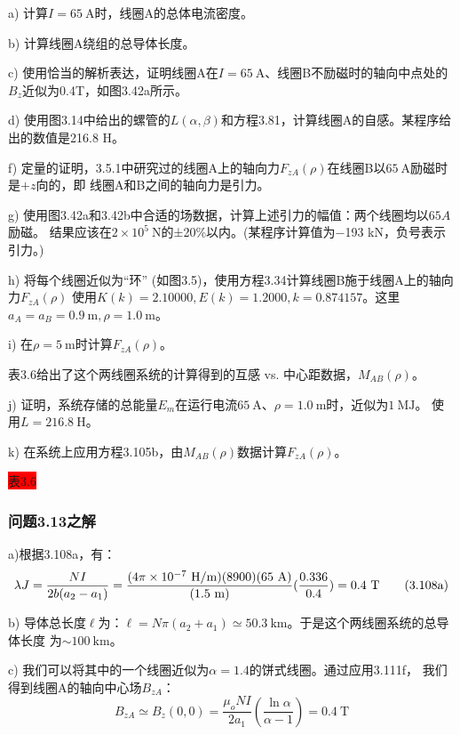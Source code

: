a) 计算$I =65\ \mathrm{A}$时，线圈A的总体电流密度。

b) 计算线圈A绕组的总导体长度。

c) 使用恰当的解析表达，证明线圈A在$I =65\ \mathrm{A}$、线圈B不励磁时的轴向中点处的$B_z$近似为0.4T，如图3.42a所示。

d) 使用图3.14中给出的螺管的$L(\alpha,\beta)$和方程3.81，计算线圈A的自感。某程序给出的数值是216.8 H。

f) 定量的证明，3.5.1中研究过的线圈A上的轴向力$F_{zA}(\rho)$在线圈B以$65\ \mathrm{A}$励磁时是$+z$向的，即
线圈A和B之间的轴向力是引力。

g) 使用图3.42a和3.42b中合适的场数据，计算上述引力的幅值：两个线圈均以$65A$励磁。
结果应该在$2\times 10^5\ \mathrm{N}$的±20\%以内。(某程序计算值为−193 kN，负号表示引力。)

h) 将每个线圈近似为“环” (如图3.5)，使用方程3.34计算线圈B施于线圈A上的轴向力$F_{zA}(\rho)$
使用$K(k) =2.10000,E(k)=1.2000,k=0.874157$。这里$a_A=a_B=0.9 \ \mathrm{m},\rho=1.0\ \mathrm{m}$。

i) 在$\rho=5\ \mathrm{m}$时计算$F_{zA}(\rho)$。

表3.6给出了这个两线圈系统的计算得到的互感 vs. 中心距数据，$M_{AB}(\rho)$。

j) 证明，系统存储的总能量$E_m$在运行电流$65\ \mathrm{A}$、$\rho=1.0\ \mathrm{m}$时，近似为$1\ \mathrm{MJ}$。
使用$L=216.8\ \mathrm{H}$。

k) 在系统上应用方程3.105b，由$M_{AB}(\rho)$数据计算$F_{zA}(\rho)$。

\colorbox{red}{表3.6}

\subsubsection{问题3.13之解}
a)根据3.108a，有：
\begin{equation*}
\lambda J=\frac{NI}{2b(a_{2}-a_{1})}\\%
=\frac{(4\pi\times 10^{-7}\ \mathrm{H/m})(8900)(65\ \mathrm{A})}{(1.5\ \mathrm{m})}(\frac{0.336}{0.4})=0.4\ \mathrm{T}\tag{3.108a}
\end{equation*}

b) 导体总长度$\ell$为：$\ell=N\pi(a_2+a_1)\simeq 50.3\ \mathrm{km}$。于是这个两线圈系统的总导体长度
为$\sim 100\ \mathrm{km}$。

c) 我们可以将其中的一个线圈近似为$\alpha=1.4$的饼式线圈。通过应用3.111f，
我们得到线圈A的轴向中心场$B_{zA}$：
\begin{equation*}
B_{zA}\simeq B_{z}(0,0)=\frac{\mu_{o}NI}{2a_{1}}(\frac{\ln\alpha}{\alpha-1})=0.4\ \mathrm{T} \tag{3.111f}
\end{equation*}

